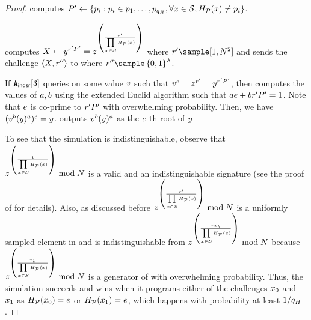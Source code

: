 \begin{proof}
	\item \rsaAdversary computes $\randPrimeAccSet' \gets \{ \randPrimes[i]:\randPrimes[i] \in \randPrimes[1], \dots, \randPrimes[\oracleQueries],  \forall \genericSetElmt \in \genericSetVar, \primeRO(\genericSetElmt)   \neq \randPrimes[i] \}$. 

\item \rsaAdversary computes $\dhVar[1] \gets \genericFnOutput^{\genericRandAlt P'} = 
	\simFnOutput^{ \left(\frac{\genericRandAlt}{\challengeSetAcc}\right)}$ where 
	$\genericRandAlt \sample [1, \rsaMod^2]$ and sends the challenge 
	$\tupleDefn{\dhVar[1], \genericRandAltAlt}$ to  where $\genericRandAltAlt \sample 
		\setDefn{0,1}^{\secParam}$. 
	
	
	\item If $\indsrAdversary{3}$ queries \ro on some value $v$ such that 
	$\genericVal^{\rsaExponent} = \simFnOutput^{\genericRandAlt} = 
	\genericFnOutput^{\genericRandAlt 
	\randPrimeAccSet'}$, then \rsaAdversary computes the values of $\euclideanConst[1], 
	\euclideanConst[2]$ using the 
	extended Euclid algorithm such that 
	$\euclideanConst[1] \rsaExponent + \euclideanConst[2] \genericRandAlt \randPrimeAccSet' = 1$. 
	Note that $e$ is co-prime to $\genericRandAlt \randPrimeAccSet'$ with overwhelming 
	probability. Then, we have 
	$(\genericVal^{\euclideanConst[2]} (\genericFnOutput)^{\euclideanConst[1]})^{\rsaExponent} 
	= \genericFnOutput$. \rsaAdversary outputs $\genericVal^{\euclideanConst[2]} 
	(\genericFnOutput)^{\euclideanConst[1]}$ as the $e$-th root of $\genericFnOutput$ 
	
\enumListEnd


To see that the simulation is indistinguishable, observe that 
$\simFnOutput^{\left(\frac{1}{\challengeSetAcc}\right)} \bmod \rsaMod$ is a valid and an 
indistinguishable signature 
(see the proof of  for details). Also, as discussed before $ 	
\simFnOutput^{\left(\frac{\genericRandAlt}{\challengeSetAcc}\right)} \bmod \rsaMod$ is a uniformly 
sampled element 
in \qrGroup 
and is indistinguishable from $\simFnOutput^{\left(\frac{\genericRand 
\genericSetElmt[\indBit]}{\challengeSetAcc}\right)} \bmod \rsaMod$ because 
$\simFnOutput^{\left(\frac{
\genericSetElmt[\indBit]}{\challengeSetAcc}\right)} \bmod \rsaMod$ is a generator of \qrGroup with 
overwhelming probability. Thus, the simulation succeeds and \rsaAdversary wins when it programs 
either of the challenges $\genericSetElmt[0]$ and $\genericSetElmt[1]$ as  
$\primeRO(\genericSetElmt[0]) = \rsaExponent$ or 
$\primeRO(\genericSetElmt[1]) = \rsaExponent$, which happens with probability at least 
$1/q_H$. 


\end{proof}
\iffalse 
